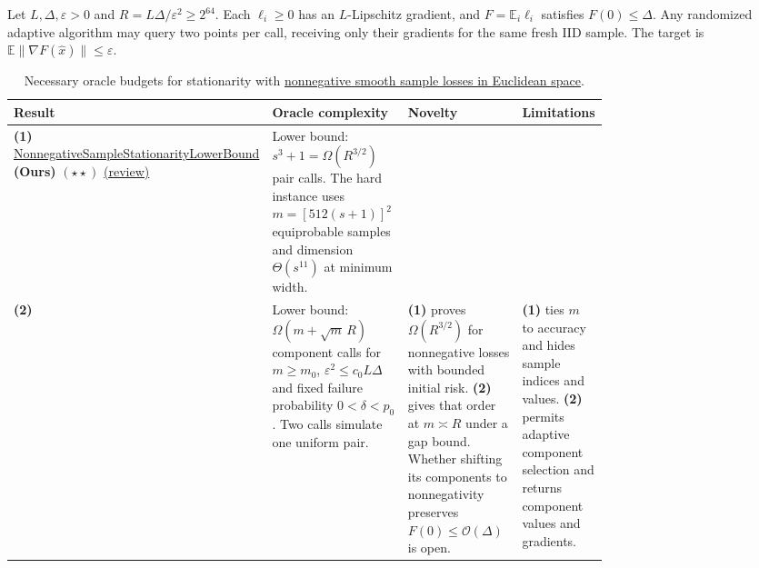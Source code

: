 \begin{table}[tp]
\centering
\caption{Necessary oracle budgets for stationarity with \href{https://github.com/k3nfalt/longtails/blob/main/LongTails/Setups/NonnegativeSmoothSampleLossEuclidean.lean}{nonnegative smooth sample losses in Euclidean space}.}\label{tab:NonnegativeSmoothSampleLossEuclidean}
\parbox{\linewidth}{\footnotesize Let $L,\Delta,\varepsilon>0$ and $R=L\Delta/\varepsilon^2\ge2^{64}$. Each $\ell_i\ge0$ has an $L$-Lipschitz gradient, and $F=\mathbb E_i\ell_i$ satisfies $F(0)\le\Delta$. Any randomized adaptive algorithm may query two points per call, receiving only their gradients for the same fresh IID sample. The target is $\mathbb E\|\nabla F(\hat x)\|\le\varepsilon$.}\par\smallskip
\begin{threeparttable}
\footnotesize
\setlength{\tabcolsep}{4pt}\renewcommand{\arraystretch}{1.25}
\begin{tabularx}{\linewidth}{@{}>{\raggedright\arraybackslash}p{0.20\linewidth}>{\raggedright\arraybackslash}p{0.28\linewidth}>{\raggedright\arraybackslash}p{0.28\linewidth}>{\raggedright\arraybackslash}X@{}}
\toprule
\textbf{Result} & \textbf{Oracle complexity} & \textbf{Novelty} & \textbf{Limitations} \\
\midrule
\textbf{(1)} \href{https://github.com/k3nfalt/longtails/blob/main/LongTails/Theorems/NonnegativeSampleStationarityLowerBound.lean}{Nonnegative\allowbreak Sample\allowbreak Stationarity\allowbreak Lower\allowbreak Bound} \textbf{(Ours)} $(\star\star)$ \href{https://github.com/k3nfalt/longtails/blob/main/scripts/reviews/NonnegativeSampleStationarityLowerBound.md}{(review)}
& Lower bound: $s^3+1=\Omega(R^{3/2})$ pair calls. The hard instance uses $m=[512(s+1)]^2$ equiprobable samples and dimension $\Theta(s^{11})$ at minimum width. & & \\
\midrule[1.2pt]
\textbf{(2)} \citep[Thm.~3.1]{pengTangJiaDenseV3}
& Lower bound: $\Omega(m+\sqrt m\,R)$ component calls for $m\ge m_0$, $\varepsilon^2\le c_0L\Delta$ and fixed failure probability $0<\delta<p_0$. Two calls simulate one uniform pair.
& \textbf{(1)} proves $\Omega(R^{3/2})$ for nonnegative losses with bounded initial risk. \textbf{(2)} gives that order at $m\asymp R$ under a gap bound. Whether shifting its components to nonnegativity preserves $F(0)\le\mathcal{O}(\Delta)$ is open.
& \textbf{(1)} ties $m$ to accuracy and hides sample indices and values. \textbf{(2)} permits adaptive component selection and returns component values and gradients. \\

\end{tabularx}
\end{threeparttable}
\end{table}

